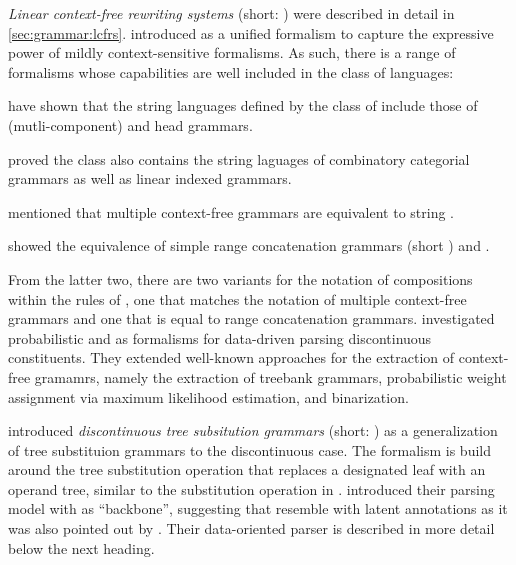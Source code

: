 \documentclass[../document.tex]{subfiles}
\begin{document}
    \emph{Linear context-free rewriting systems} (short: ) were described in detail in \cref{sec:grammar:lcfrs}.
    \citet{VijWeiJos87,Weir88} introduced  as a unified formalism to capture the expressive power of mildly context-sensitive formalisms.
    As such, there is a range of formalisms whose capabilities are well included in the class of  languages:
    \begin{compactitem}
        \item \citet{VijWeiJos87} have shown that the string languages defined by the class of  include those of (mutli-component)  and head grammars.
        \item \citet{vijay1994equivalence} proved the class also contains the string laguages of combinatory categorial grammars as well as linear indexed grammars.
        \item \citet{SekMatFujKas91} mentioned that multiple context-free grammars are equivalent to string .
        \item \citet{boullier1998proposal} showed the equivalence of simple range concatenation grammars (short ) and .
    \end{compactitem}
    From the latter two, there are two variants for the notation of compositions within the rules of , one that matches the notation of multiple context-free grammars and one that is equal to range concatenation grammars.
    \citet{MaierSogaard08,MailKal10} investigated probabilistic  and  as formalisms for data-driven parsing discontinuous constituents.
    They extended well-known approaches for the extraction of context-free gramamrs, namely the extraction of treebank grammars, probabilistic weight assignment via maximum likelihood estimation, and binarization.
    
    \citet{CraSchBod16} introduced \emph{discontinuous tree subsitution grammars} (short: ) as a generalization of tree substituion grammars \citep{} to the discontinuous case.
    The formalism is build around the tree substitution operation that replaces a designated leaf with an operand tree, similar to the substitution operation in .
    \citet{Cra11} introduced their parsing model with  as ``backbone'', suggesting that  resemble  with latent annotations as it was also pointed out by \citet[Section 8.5.1]{Geb20}.
    Their data-oriented parser is described in more detail below the next heading.
\end{document}
